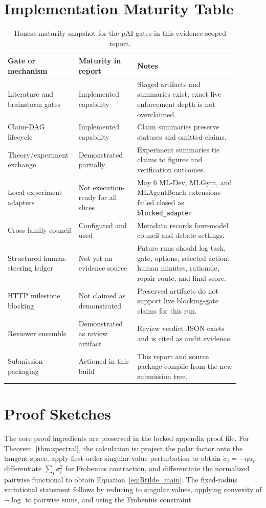 \documentclass{article}
\begin{document}
\section{Implementation Maturity Table}
\label{app:maturity}
\begin{table}[h]
\centering
\caption{Honest maturity snapshot for the pAI gates in this evidence-scoped report.}
\small
\begin{tabular}{@{}p{0.24\linewidth}p{0.24\linewidth}p{0.42\linewidth}@{}}
\toprule
\textbf{Gate or mechanism} & \textbf{Maturity in report} & \textbf{Notes} \\
\midrule
Literature and brainstorm gates & Implemented capability & Staged artifacts and summaries exist; exact live enforcement depth is not overclaimed. \\
Claim-DAG lifecycle & Implemented capability & Claim summaries preserve statuses and omitted claims. \\
Theory/experiment exchange & Demonstrated partially & Experiment summaries tie claims to figures and verification outcomes. \\
Local experiment adapters & Not execution-ready for all slices & May 6 ML-Dev, MLGym, and MLAgentBench extensions failed closed as \texttt{blocked\_adapter}. \\
Cross-family council & Configured and used & Metadata records four-model council and debate settings. \\
Structured human-steering ledger & Not yet an evidence source & Future runs should log task, gate, options, selected action, human minutes, rationale, repair route, and final score. \\
HTTP milestone blocking & Not claimed as demonstrated & Preserved artifacts do not support live blocking-gate claims for this run. \\
Reviewer ensemble & Demonstrated as review artifact & Review verdict JSON exists and is cited as audit evidence. \\
Submission packaging & Actioned in this build & This report and source package compile from the new submission tree. \\
\bottomrule
\end{tabular}
\end{table}

\section{Proof Sketches}
The core proof ingredients are preserved in the locked appendix proof file. For Theorem~\ref{thm:spectral}, the calculation is: project the polar factor onto the tangent space, apply first-order singular-value perturbation to obtain $\dot\sigma_i=-\eta\alpha_i$, differentiate $\sum_i\sigma_i^2$ for Frobenius contraction, and differentiate the normalized pairwise functional to obtain Equation~\eqref{eq:Rtilde_main}. The fixed-radius variational statement follows by reducing to singular values, applying convexity of $-\log$ to pairwise sums, and using the Frobenius constraint.
\end{document}
